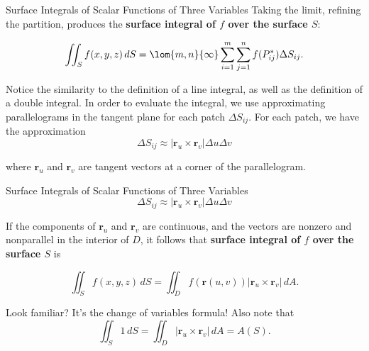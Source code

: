 \documentclass[11pt,english,
handout
]{beamer}
\begin{document}
\begin{frame}[t]{Surface Integrals of Scalar Functions of Three Variables}
\small
Taking the limit, refining the partition, produces the \textbf{surface integral of $f$ over the surface $S$}:

\[
\iint_Sf(x,y,z)\,dS=\lom{m,n}{\infty}\sum_{i=1}^m\sum_{j=1}^nf(P_{ij}^*)\Delta S_{ij}.
\]\pause 

Notice the similarity to the definition of a line integral, as well as the definition of a double integral. \pause In order to evaluate the integral, we use approximating parallelograms in the tangent plane for each patch $\Delta S_{ij}$. For each patch, we have the approximation
\[
\Delta S_{ij}\approx|\mathbf{r}_u\times\mathbf{r}_v|\Delta u\Delta v
\]

where $\mathbf{r}_u$ and $\mathbf{r}_v$ are tangent vectors at a corner of the parallelogram. 
\end{frame}






\begin{frame}[t]{Surface Integrals of Scalar Functions of Three Variables}
\small
\[
\Delta S_{ij}\approx|\mathbf{r}_u\times\mathbf{r}_v|\Delta u\Delta v
\]

If the components of $\mathbf{r}_u$ and $\mathbf{r}_v$ are continuous, and the vectors are nonzero and nonparallel in the interior of $D$, it follows that \textbf{surface integral of $f$ over the surface $S$} is

\[
\boxed{\iint_Sf(x,y,z)\,dS=\iint_Df(\mathbf{r}(u,v))|\mathbf{r}_u\times\mathbf{r}_v|\,dA.}
\]

\lspace
Look familiar? \pause It's the change of variables formula! \pause Also note that
\[
\iint_S1\,dS=\iint_D|\mathbf{r}_u\times\mathbf{r}_v|\,dA=A(S).
\]
\end{frame}
\end{document}

